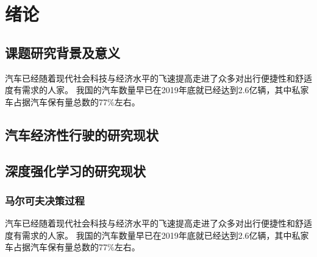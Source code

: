 \chapter{绪论}
\section{课题研究背景及意义}
汽车已经随着现代社会科技与经济水平的飞速提高走进了众多对出行便捷性和舒适度有需求的人家。
我国的汽车数量早已在2019年底就已经达到2.6亿辆，其中私家车占据汽车保有量总数的77\%左右。
\section{汽车经济性行驶的研究现状}
\section{深度强化学习的研究现状}
\subsection{马尔可夫决策过程}
汽车已经随着现代社会科技与经济水平的飞速提高走进了众多对出行便捷性和舒适度有需求的人家。
我国的汽车数量早已在2019年底就已经达到2.6亿辆，其中私家车占据汽车保有量总数的77\%左右。